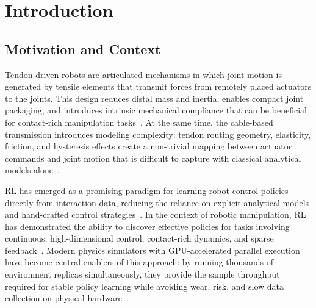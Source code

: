 \chapter{Introduction}\label{ch:introduction}


\section{Motivation and Context}

Tendon-driven robots are articulated mechanisms in which joint motion is generated by tensile elements that transmit forces from remotely placed actuators to the joints. This design reduces distal mass and inertia, enables compact joint packaging, and introduces intrinsic mechanical compliance that can be beneficial for contact-rich manipulation tasks~\cite{Rao2021TDCRModeling,Nemoto2022CableWrist,Bicchi2004FastSoftArm}. At the same time, the cable-based transmission introduces modeling complexity: tendon routing geometry, elasticity, friction, and hysteresis effects create a non-trivial mapping between actuator commands and joint motion that is difficult to capture with classical analytical models alone~\cite{Miyasaka2020HysteresisFriction,Kato2016Neuroendoscopy}.

\ac{RL} has emerged as a promising paradigm for learning robot control policies directly from interaction data, reducing the reliance on explicit analytical models and hand-crafted control strategies~\cite{SuttonBarto2018,Kober2013Survey}. In the context of robotic manipulation, \ac{RL} has demonstrated the ability to discover effective policies for tasks involving continuous, high-dimensional control, contact-rich dynamics, and sparse feedback~\cite{Kober2013Survey}. Modern physics simulators with \ac{GPU}-accelerated parallel execution have become central enablers of this approach: by running thousands of environment replicas simultaneously, they provide the sample throughput required for stable policy learning while avoiding wear, risk, and slow data collection on physical hardware~\cite{Makoviychuk2021IsaacGym}.

